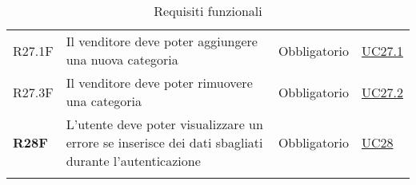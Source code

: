 \begin{center}
\begin{longtable}[!h]{p{50px} p{245px} p{75px} p{50px}}
        R27.1F                                & Il venditore deve poter aggiungere una nuova categoria                                                     & Obbligatorio             & \hyperref[sec:UC27.1]{UC27.1}                \\
        R27.3F                                & Il venditore deve poter rimuovere una categoria                                                            & Obbligatorio             & \hyperref[sec:UC27.2]{UC27.2}                \\
        \textbf{R28F}                         & L'utente deve poter visualizzare un errore se inserisce dei dati sbagliati durante l'autenticazione        & Obbligatorio             & \hyperref[sec:UC28]{UC28}                    \\
        \rowcolor{white}\caption{Requisiti funzionali}                                                                                                                                                                               \\
    \end{longtable}
\end{center}

\newpage

